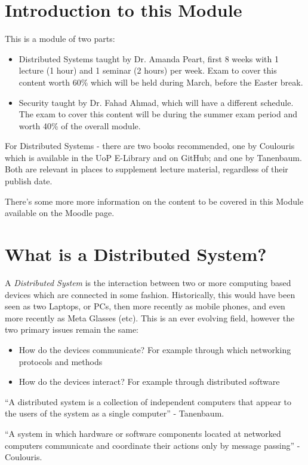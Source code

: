 
\section{Introduction to this Module}
This is a module of two parts:
\begin{itemize}
    \item Distributed Systems taught by Dr. Amanda Peart, first 8 weeks with 1 lecture (1 hour) and 1 seminar (2 hours) per week. Exam to cover this content worth 60\% which will be held during March, before the Easter break.
    \item Security taught by Dr. Fahad Ahmad, which will have a different schedule. The exam to cover this content will be during the summer exam period and worth 40\% of the overall module. 
\end{itemize}

For Distributed Systems - there are two books recommended, one by Coulouris which is available in the UoP E-Library and on GitHub; and one by Tanenbaum. Both are relevant in places to supplement lecture material, regardless of their publish date. 

\begin{extlink}
There's some more more information on the content to be covered in this Module available on the Moodle page.
\end{extlink}

\section{What is a Distributed System?}
A \textit{Distributed System} is the interaction between two or more computing based devices which are connected in some fashion. Historically, this would have been seen as two Laptops, or PCs, then more recently as mobile phones, and even more recently as Meta Glasses (etc). This is an ever evolving field, however the two primary issues remain the same:
\begin{itemize}
    \item How do the devices communicate? For example through which networking protocols and methods
    \item How do the devices interact? For example through distributed software
\end{itemize}

\begin{define}
\item[Distributed System] ``A distributed system is a collection of independent computers that appear to the users of the system as a single computer'' - Tanenbaum.
\item[Distributed System] ``A system in which hardware or software components located at networked computers communicate and coordinate their actions only by message passing'' - Coulouris.
\end{define}


